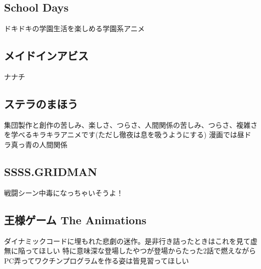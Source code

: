 \documentclass{jarticle}
\begin{document}
   \subsection{School Days}
      ドキドキの学園生活を楽しめる学園系アニメ
   \subsection{メイドインアビス}
      ナナチ
   \subsection{ステラのまほう}
      集団製作と創作の苦しみ、楽しさ、つらさ、人間関係の苦しみ、つらさ、複雑さを学べるキラキラアニメです(ただし徹夜は息を吸うようにする)
      漫画では昼ドラ真っ青の人間関係
   \subsection{SSSS.GRIDMAN}
      戦闘シーン中毒になっちゃいそうよ！
   \subsection{王様ゲーム The Animations}
      ダイナミックコードに埋もれた悲劇の迷作。是非行き詰ったときはこれを見て虚無に陥ってほしい
      特に意味深な登場したやつが登場からたった2話で燃えながらPC弄ってワクチンプログラムを作る姿は皆見習ってほしい
\end{document}
